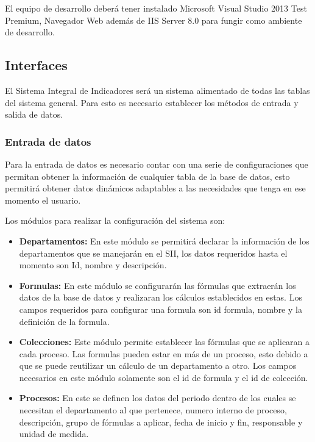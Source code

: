 		El equipo de desarrollo deber\'a tener instalado Microsoft Visual Studio 2013 Test Premium, Navegador Web adem\'as de IIS Server 8.0 para fungir como ambiente de desarrollo.\\

		\subsection{Interfaces}
		
			El Sistema Integral de Indicadores ser\'a un sistema alimentado de todas las tablas del sistema general. Para esto es necesario establecer los m\'etodos de entrada y salida de datos.\\

			\subsubsection{Entrada de datos}

				Para la entrada de datos es necesario contar con una serie de configuraciones que permitan obtener la informaci\'on de cualquier tabla de la base de datos, esto permitir\'a obtener datos din\'amicos adaptables a las necesidades que tenga en ese momento el usuario.

				Los m\'odulos para realizar la configuraci\'on del sistema son:
				\begin{itemize}
					\item \textbf{Departamentos:} En este m\'odulo se permitir\'a declarar la informaci\'on de los departamentos que se manejar\'an en el SII, los datos requeridos hasta el momento son Id, nombre y descripci\'on.
					\item \textbf{Formulas:} En este m\'odulo se configurar\'an las f\'ormulas que extraer\'an los datos de la base de datos y realizaran los c\'alculos establecidos en estas. Los campos requeridos para configurar una formula son id formula, nombre y la definici\'on de la formula.
					\item \textbf{Colecciones:} Este m\'odulo permite establecer las f\'ormulas que se aplicaran a cada proceso. Las formulas pueden estar en m\'as de un proceso, esto debido a que se puede reutilizar un c\'alculo de un departamento a otro. Los campos necesarios en este m\'odulo solamente son el id de formula y el id de colecci\'on.
					\item \textbf{Procesos:} En este se definen los datos del periodo dentro de los cuales se necesitan el departamento al que pertenece, numero interno de proceso, descripci\'on, grupo de f\'ormulas a aplicar, fecha de inicio y fin, responsable y unidad de medida.
				\end{itemize}

